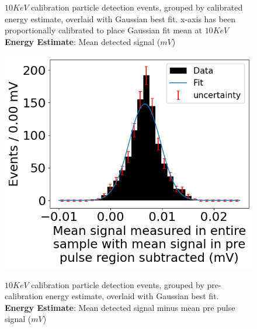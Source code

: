 \begin{figure}[H]
\begin{minipage}[t]{0.45\linewidth}
\begin{center}
			\caption{
                $10\unit{KeV}$ calibration particle detection events, grouped by calibrated energy estimate, overlaid with Gaussian best fit. x-axis has been proportionally calibrated to place Gaussian fit mean at $10\unit{KeV}$ \\
                \textbf{Energy Estimate}: Mean detected signal ($\unit{mV}$)
            }
		\end{center}
	\end{minipage}
\end{figure}

\begin{figure}[H]
	\begin{minipage}[t]{0.45\linewidth}
		\begin{center}
            \label{fig::area2}
			\includegraphics[width=\textwidth]{figures/area2.png}
			\caption{
                $10\unit{KeV}$ calibration particle detection events, grouped by pre-calibration energy estimate, overlaid with Gaussian best fit.\\
                \textbf{Energy Estimate}: Mean detected signal minus mean pre pulse signal  ($\unit{mV}$)
            }
		\end{center}
	\end{minipage}
    \hfill
	\begin{minipage}[t]{0.45\linewidth}
		\begin{center}
            \label{fig::area2--cal}

\end{center}
\end{minipage}
\end{figure}

